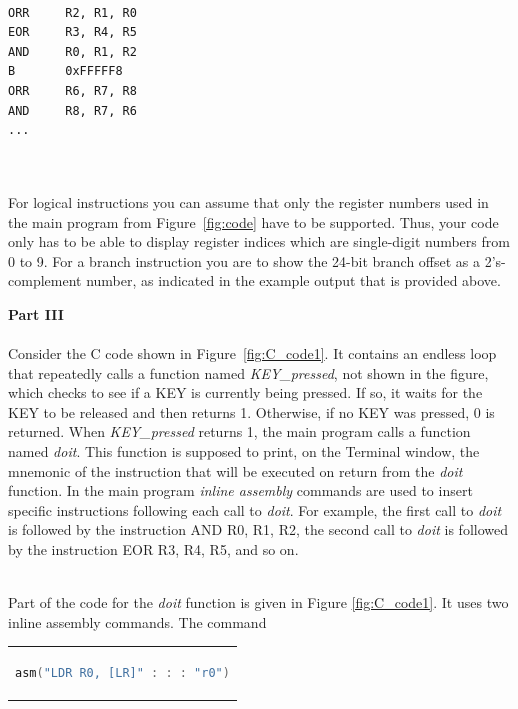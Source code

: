 \documentclass[epsfig,10pt,fullpage]{article}
\begin{document}
~\\
\begin{minipage}[t]{12.5 cm}
\begin{lstlisting}
ORR 	R2, R1, R0
EOR 	R3, R4, R5
AND 	R0, R1, R2
B 		0xFFFFF8
ORR 	R6, R7, R8
AND 	R8, R7, R6
...
\end{lstlisting}
\end{minipage}

~\\
~\\
For logical instructions you can assume that only the register numbers used 
in the main program from Figure~\ref{fig:code} have to be supported. Thus, your code only has to 
be able to display register indices which are single-digit numbers from 0 to 9. For a
branch instruction you are to show the 24-bit branch offset as a 2's-complement number, as
indicated in the example output that is provided above.

\noindent
{\bf Part III}
~\\
~\\
\noindent
Consider the C code shown in Figure~\ref{fig:C_code1}. It contains an endless loop that
repeatedly calls a function named {\it KEY\_pressed}, not shown in the figure, which 
checks to see if a KEY is
currently being pressed. If so, it waits for the KEY to be released and then returns 1. 
Otherwise, if no KEY was pressed, 0 is returned. When {\it KEY\_pressed} returns 1, the main
program calls a function named {\it doit}. This function is supposed to print, on the Terminal 
window, the mnemonic of the instruction that will be executed on return from the {\it doit}
function. In the main program {\it inline assembly} commands are used to insert specific
instructions following each call to {\it doit}. For example, the first call to {\it doit}
is followed by the instruction {\sf AND R0, R1, R2}, the second call to {\it doit} is
followed by the instruction {\sf EOR R3, R4, R5}, and so on.

~\\
\noindent
Part of the code for the {\it doit} function is given in Figure \ref{fig:C_code1}. It uses two
inline assembly commands. The command


\begin{center}
\begin{tabular}{c}
\begin{lstlisting}[language=C]
asm("LDR R0, [LR]" : : : "r0")
\end{lstlisting}
\end{tabular}
\end{center}
\end{document}
